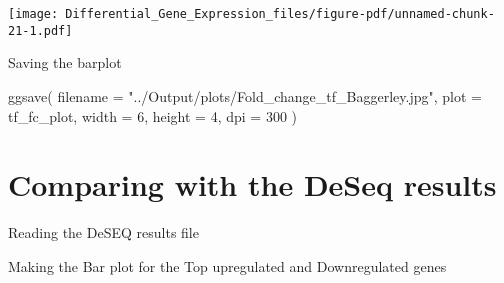 \documentclass[
  letterpaper,
  DIV=11,
  numbers=noendperiod]{scrartcl}
\newenvironment{Shaded}{\begin{snugshade}}{\end{snugshade}}
\newcommand{\AttributeTok}[1]{\textcolor[rgb]{0.40,0.45,0.13}{#1}}
\newcommand{\ConstantTok}[1]{\textcolor[rgb]{0.56,0.35,0.01}{#1}}
\newcommand{\DecValTok}[1]{\textcolor[rgb]{0.68,0.00,0.00}{#1}}
\newcommand{\FunctionTok}[1]{\textcolor[rgb]{0.28,0.35,0.67}{#1}}
\newcommand{\NormalTok}[1]{\textcolor[rgb]{0.00,0.23,0.31}{#1}}
\newcommand{\OtherTok}[1]{\textcolor[rgb]{0.00,0.23,0.31}{#1}}
\newcommand{\SpecialCharTok}[1]{\textcolor[rgb]{0.37,0.37,0.37}{#1}}
\newcommand{\StringTok}[1]{\textcolor[rgb]{0.13,0.47,0.30}{#1}}
\begin{document}
\texttt{[image: Differential\_Gene\_Expression\_files/figure-pdf/unnamed-chunk-21-1.pdf]}

Saving the barplot

\begin{Shaded}
\begin{Highlighting}[]
\FunctionTok{ggsave}\NormalTok{(}
  \AttributeTok{filename =} \StringTok{"../Output/plots/Fold\_change\_tf\_Baggerley.jpg"}\NormalTok{,   }
  \AttributeTok{plot =}\NormalTok{ tf\_fc\_plot,                      }
  \AttributeTok{width =} \DecValTok{6}\NormalTok{, }\AttributeTok{height =} \DecValTok{4}\NormalTok{,               }
  \AttributeTok{dpi =} \DecValTok{300}                            
\NormalTok{)}
\end{Highlighting}
\end{Shaded}

\section{Comparing with the DeSeq
results}\label{comparing-with-the-deseq-results}

Reading the DeSEQ results file

\begin{Shaded}
\end{Shaded}

Making the Bar plot for the Top upregulated and Downregulated genes
\end{document}
